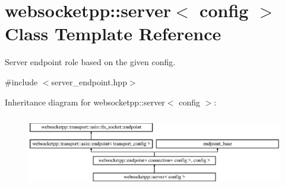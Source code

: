 \hypertarget{classwebsocketpp_1_1server}{}\section{websocketpp\+:\+:server$<$ config $>$ Class Template Reference}
\label{classwebsocketpp_1_1server}


Server endpoint role based on the given config.  




{\ttfamily \#include $<$server\+\_\+endpoint.\+hpp$>$}

Inheritance diagram for websocketpp\+:\+:server$<$ config $>$\+:\begin{figure}[H]
\begin{center}
\leavevmode
\includegraphics[height=3.218391cm]{classwebsocketpp_1_1server}
\end{center}
\end{figure}
